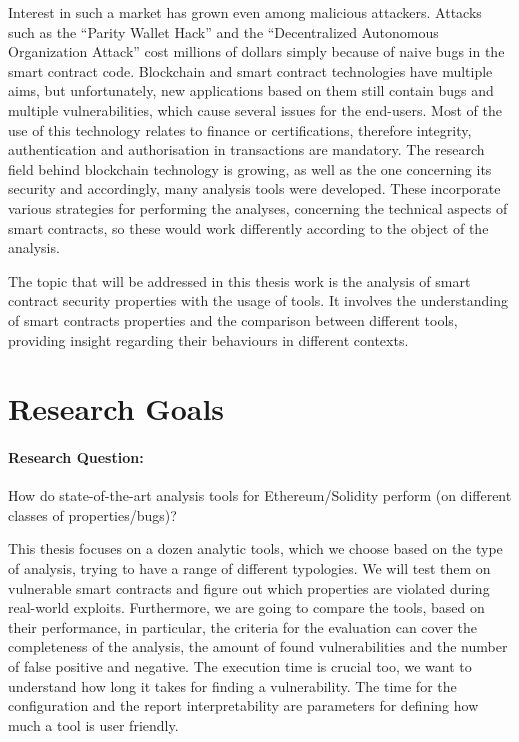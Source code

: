 Interest in such a market has grown even among malicious attackers. 
Attacks such as the “Parity Wallet Hack” and the “Decentralized Autonomous Organization Attack” cost millions of dollars simply because of 
naive bugs in the smart contract code. Blockchain and smart contract technologies have multiple aims, but unfortunately, new applications 
based on them still contain bugs and multiple vulnerabilities, which cause 
several issues for the end-users. Most of the use of this technology relates to finance or certifications, therefore integrity, 
authentication and authorisation in transactions are mandatory. The research field behind blockchain technology is growing, as well as the one concerning 
its security and accordingly, many analysis tools were developed. 
These incorporate various strategies for performing the analyses, concerning the technical aspects of smart contracts, 
so these would work differently according to the object of the analysis. 

The topic that will be addressed in this thesis work is the analysis of smart contract security properties with the usage of tools. 
It involves the understanding of smart contracts properties and the comparison between different tools, 
providing insight regarding their behaviours in different contexts.


\section{Research Goals}
\label{sec:Introduction:ResearchGoals}
\paragraph{Research Question:} 
How do state-of-the-art analysis tools for Ethereum/Solidity perform (on different classes of properties/bugs)?

This thesis focuses on a dozen analytic tools, which we choose based on the type of analysis, trying to have a range of different typologies. 
We will test them on vulnerable smart contracts and figure out which properties are violated during real-world exploits. 
Furthermore, we are going to compare the tools, based on their performance, in particular, the criteria for the evaluation can cover the completeness of the analysis, the amount of found vulnerabilities and the number of false positive and negative. 
The execution time is crucial too, we want to understand how long it takes for finding a vulnerability. The time for the configuration and the report interpretability are parameters for defining how much a tool is user friendly. 


